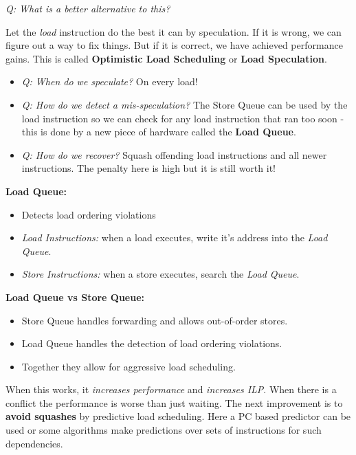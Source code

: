 \documentclass[12pt]{article}
\newenvironment{QandA}{\begin{enumerate}[label=\bfseries\arabic*.]\bfseries}
                      {\end{enumerate}}
\newenvironment{answered}{\par\quad\normalfont}{}
\begin{document}
\begin{QandA}
\begin{answered}
\textit{Q: What is a better alternative to this?}

\quad Let the \textit{load} instruction do the best it can by speculation. If it is wrong, we can figure out a way to fix things. But if it is correct, we have achieved performance gains. This is called \textbf{Optimistic Load Scheduling} or \textbf{Load Speculation}.

\begin{itemize}
    \item \textit{Q: When do we speculate?} On every load!
    \item \textit{Q: How do we detect a mis-speculation?} The Store Queue can be used by the load instruction so we can check for any load instruction that ran too soon - this is done by a new piece of hardware called the \textbf{Load Queue}. 
    \item \textit{Q: How do we recover?} Squash offending load instructions and all newer instructions. The penalty here is high but it is still worth it!
\end{itemize}

\textbf{Load Queue:}

\begin{itemize}
    \item Detects load ordering violations
    \item \textit{Load Instructions:} when a load executes, write it's address into the \textit{Load Queue}.
    \item \textit{Store Instructions:} when a store executes, search the \textit{Load Queue}. 
\end{itemize}

\textbf{Load Queue vs Store Queue:}
\begin{itemize}
    \item Store Queue handles forwarding and allows out-of-order stores.
    \item Load Queue handles the detection of load ordering violations.
    \item Together they allow for aggressive load scheduling.
\end{itemize}

When this works, it \textit{increases performance} and \textit{increases ILP}. When there is a conflict the performance is worse than just waiting. The next improvement is to \textbf{avoid squashes} by predictive load scheduling. Here a PC based predictor can be used or some algorithms make predictions over sets of instructions for such dependencies. 
\end{answered}
\end{QandA}
\end{document}
